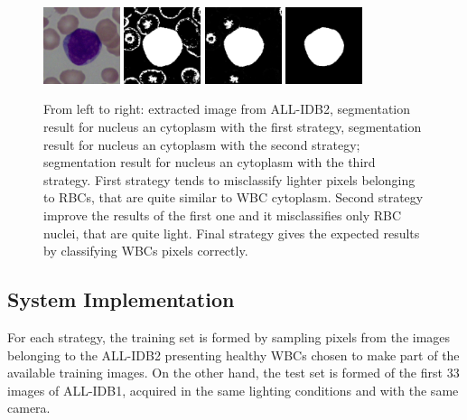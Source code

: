 {	\begin{figure}[h]
		\centering
		\includegraphics[width=0.20\textwidth]{images/2015_1_caip/1-1}
		\includegraphics[width=0.20\textwidth]{images/2015_1_caip/1-3}
		\includegraphics[width=0.20\textwidth]{images/2015_1_caip/1-4}
		\includegraphics[width=0.20\textwidth]{images/2015_1_caip/1-2}
		\caption[ALL-IDB2 sample and segmentation results.]{\label{fig:exs1} From left to right: extracted image from ALL-IDB2, segmentation result for nucleus an cytoplasm with the first strategy, segmentation result for nucleus an cytoplasm with the second strategy; segmentation result for nucleus an cytoplasm with the third strategy. First strategy tends to misclassify lighter pixels belonging to RBCs, that are quite similar to WBC cytoplasm. Second strategy improve the results of the first one and it misclassifies only RBC nuclei, that are quite light. Final strategy gives the expected results by classifying WBCs pixels correctly. }
	\end{figure}
	
	\subsection{System Implementation}
	For each strategy, the training set is formed by sampling pixels from the images belonging to the ALL-IDB2 presenting healthy WBCs chosen to make part of the available training images. On the other hand, the test set is formed of the first 33 images of ALL-IDB1, acquired in the same lighting conditions and with the same camera. 
	
}
